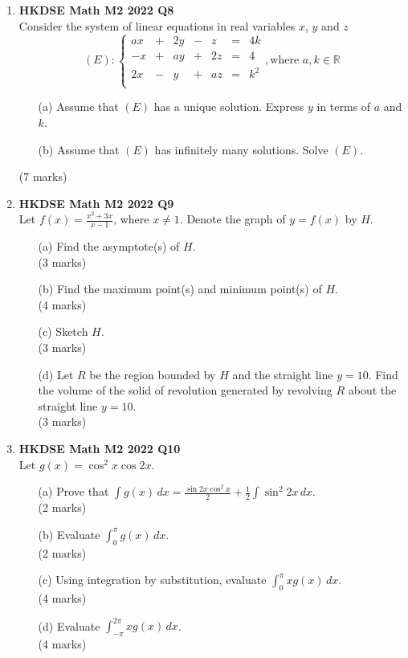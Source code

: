 \documentclass{report}
\begin{document}
\begin{enumerate}
	\item \textbf{HKDSE Math M2 2022 Q8}\\
	Consider the system of linear equations in real variables $x$, $y$ and $z$
		$$(E) : \left\{\begin{matrix}
		ax&  +&2y&  -& z& = &4k  \\
		-x&  +&ay&  +&2z& = &4   \\
		2x&  -& y&  +&az& = &k^2 \\
		\end{matrix}\right. , \text{where } a,k \in \mathbb{R}$$
	\begin{enumerate}
		\item [(a)] Assume that $(E)$ has a unique solution. Express $y$ in terms of $a$ and $k$.
		\item [(b)] Assume that $(E)$ has infinitely many solutions. Solve $(E)$. 
	\end{enumerate}
	(7 marks)

	\item \textbf{HKDSE Math M2 2022 Q9}\\
	Let $\displaystyle f(x) = \frac{x^2 +3x}{x-1}$, where $x \neq 1$. Denote the graph of $y = f(x)$ by $H$.
	\begin{enumerate}
		\item [(a)] Find the asymptote(s) of $H$. \\(3 marks)
		\item [(b)] Find the maximum point(s) and minimum point(s) of $H$. \\(4 marks)
		\item [(c)] Sketch $H$. \\(3 marks)
		\item [(d)] Let $R$ be the region bounded by $H$ and the straight line $y = 10$. Find the volume of the solid of revolution generated by revolving $R$ about the straight line $y = 10$. \\(3 marks)
	\end{enumerate}

	\item \textbf{HKDSE Math M2 2022 Q10}\\
	Let $g(x) = \cos^2{x}\cos{2x}$.
	\begin{enumerate}
		\item [(a)] Prove that $\displaystyle \int g(x) \,dx = \frac{\sin{2x}\cos^2{x}}{2} + \frac{1}{2} \int \sin^2{2x}\,dx$. \\(2 marks)
		\item [(b)] Evaluate $\displaystyle \int_{0}^{\pi} g(x) \,dx$. \\(2 marks)
		\item [(c)] Using integration by substitution, evaluate $\displaystyle \int_{0}^{\pi} xg(x) \,dx$. \\(4 marks)
		\item [(d)] Evaluate $\displaystyle \int_{-\pi}^{2\pi} xg(x) \,dx$. \\(4 marks)
	\end{enumerate}


\end{enumerate}
\end{document}
